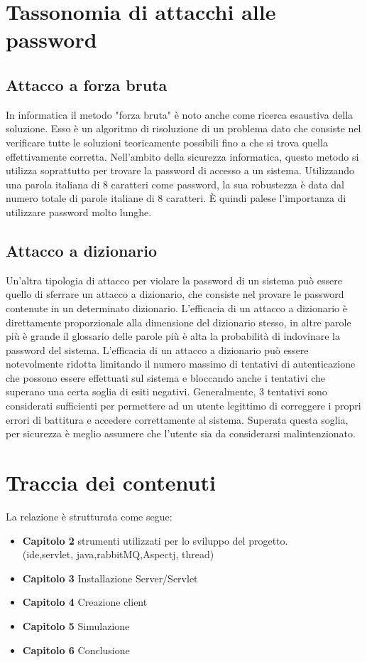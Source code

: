 \documentclass[a4paper,12pt,titlepage,oneside,openany]{book}
\begin{document}
\section{Tassonomia di attacchi alle password}
\subsection{Attacco a forza bruta}
In informatica il metodo "forza bruta" è noto anche come ricerca esaustiva della soluzione. Esso è un algoritmo di risoluzione di un problema dato che consiste nel verificare tutte le soluzioni teoricamente possibili fino a che si trova quella effettivamente corretta. Nell'ambito della sicurezza informatica, questo metodo si utilizza soprattutto per trovare la password di accesso a un sistema. Utilizzando una parola italiana di 8 caratteri come password, la sua robustezza è data dal numero totale di parole italiane di 8 caratteri. È quindi palese l'importanza di utilizzare password molto lunghe.
\subsection{Attacco a dizionario}
Un'altra tipologia di attacco per violare la password di un sistema può essere quello di sferrare un attacco a dizionario, che consiste nel provare le password contenute in un determinato dizionario. L'efficacia di un attacco a dizionario è direttamente proporzionale alla dimensione del dizionario stesso, in altre parole più è grande il glossario delle parole più è alta la probabilità di indovinare la password del sistema. L'efficacia di un attacco a dizionario può essere notevolmente ridotta limitando il numero massimo di tentativi di autenticazione che possono essere effettuati sul sistema e bloccando anche i tentativi che superano una certa soglia di esiti negativi. Generalmente, 3 tentativi sono considerati sufficienti per permettere ad un utente legittimo di correggere i propri errori di battitura e accedere correttamente al sistema. Superata questa soglia, per sicurezza è meglio assumere che l'utente sia da considerarsi malintenzionato.
\section{Traccia dei contenuti}
La relazione è strutturata come segue:
\begin{itemize}
	\item[]\textbf{Capitolo 2 } strumenti utilizzati per lo sviluppo del progetto.\\(ide,servlet, java,rabbitMQ,Aspectj, thread)
	\item[]\textbf{Capitolo 3 } Installazione Server/Servlet
	\item[]\textbf{Capitolo 4 } Creazione client
	\item[]\textbf{Capitolo 5 } Simulazione
	\item[]\textbf{Capitolo 6 } Conclusione
\end{itemize}
\end{document}
